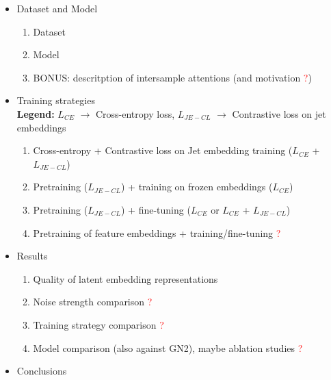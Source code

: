 \documentclass[12pt]{article}
\newcommand{\discussion}{\textcolor{red}{\Large ?}}
\begin{document}
\begin{itemize}
    \item Dataset and Model
    \begin{enumerate}
        \item Dataset
        \item Model
        \item BONUS: descritption of intersample attentions (and motivation \discussion)
    \end{enumerate}

    \item Training strategies \\
    \textbf{Legend:} $L_{CE}$ $\rightarrow$ Cross-entropy loss, $L_{JE-CL}$ $\rightarrow$ Contrastive loss on jet embeddings
    \begin{enumerate}
        \item Cross-entropy + Contrastive loss on Jet embedding training ($L_{CE}$ + $L_{JE-CL}$)
        \item Pretraining ($L_{JE-CL}$) + training on frozen embeddings ($L_{CE}$)
        \item Pretraining ($L_{JE-CL}$) + fine-tuning ($L_{CE}$ or $L_{CE}$ + $L_{JE-CL}$)

        \item Pretraining of feature embeddings + training/fine-tuning \discussion
    \end{enumerate}

    \item Results
    \begin{enumerate}
        \item Quality of latent embedding representations 
        \item Noise strength comparison \discussion
        \item Training strategy comparison \discussion
        \item Model comparison (also against GN2), maybe ablation studies \discussion
    \end{enumerate}

    \item Conclusions
    
\end{itemize}
\end{document}
